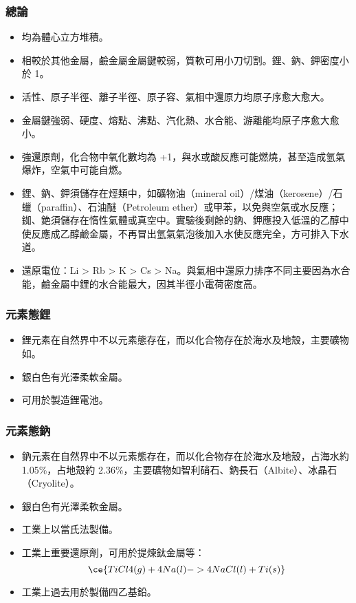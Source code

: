 \documentclass[a4paper,12pt]{report}
\begin{document}
\begin{itemize}
\begin{itemize}
\subsubsection{總論}
\begin{itemize}
\item 均為體心立方堆積。
\item 相較於其他金屬，鹼金屬金屬鍵較弱，質軟可用小刀切割。鋰、鈉、鉀密度小於 1。
\item 活性、原子半徑、離子半徑、原子容、氣相中還原力均原子序愈大愈大。
\item 金屬鍵強弱、硬度、熔點、沸點、汽化熱、水合能、游離能均原子序愈大愈小。
\item 強還原劑，化合物中氧化數均為 +1，與水或酸反應可能燃燒，甚至造成氫氣爆炸，空氣中可能自燃。
\item 鋰、鈉、鉀須儲存在烴類中，如礦物油（mineral oil）/煤油（kerosene）/石蠟（paraffin）、石油醚（Petroleum ether）或甲苯，以免與空氣或水反應；銣、銫須儲存在惰性氣體或真空中。實驗後剩餘的鈉、鉀應投入低溫的乙醇中使反應成乙醇鹼金屬，不再冒出氫氣氣泡後加入水使反應完全，方可排入下水道。
\item 還原電位：Li > Rb > K > Cs > Na。與氣相中還原力排序不同主要因為水合能，鹼金屬中鋰的水合能最大，因其半徑小電荷密度高。
\end{itemize}
\subsubsection{元素態鋰}
\begin{itemize}
\item 鋰元素在自然界中不以元素態存在，而以化合物存在於海水及地殼，主要礦物如。
\item 銀白色有光澤柔軟金屬。
\item 可用於製造鋰電池。
\end{itemize}
\subsubsection{元素態鈉}
\begin{itemize}
\item 鈉元素在自然界中不以元素態存在，而以化合物存在於海水及地殼，占海水約 1.05\%，占地殼約 2.36\%，主要礦物如智利硝石、鈉長石（Albite）、冰晶石（Cryolite）。
\item 銀白色有光澤柔軟金屬。
\item 工業上以當氏法製備。
\item 工業上重要還原劑，可用於提煉鈦金屬等：
\[\ce{TiCl4(g) + 4Na(l) -> 4NaCl(l) + Ti(s)}\]
\item 工業上過去用於製備四乙基鉛。
\end{itemize}

\end{itemize}
\end{itemize}
\end{document}
